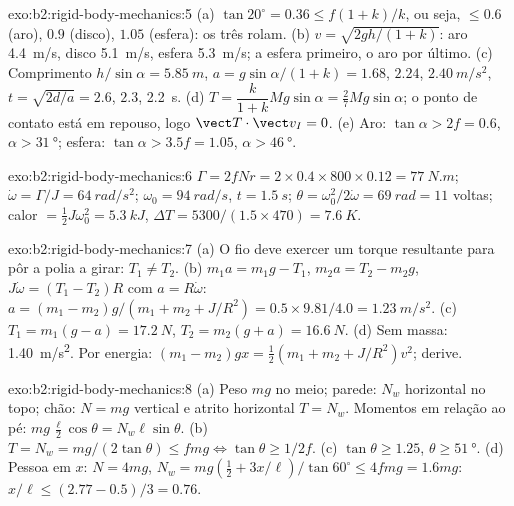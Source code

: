 \begin{solution}{exo:b2:rigid-body-mechanics:5}
(a) $\tan20^\circ = 0.36 \le f(1 + k)/k$, ou seja, $\le 0.6$ (aro), $0.9$
(disco), $1.05$ (esfera): os três rolam. (b) $v = \sqrt{2gh/(1 + k)}$: aro
\qty{4.4}{m/s}, disco \qty{5.1}{m/s}, esfera \qty{5.3}{m/s}; a esfera primeiro, o aro
por último. (c) Comprimento $h/\sin\alpha = \qty{5.85}{m}$, $a = g\sin\alpha/(1 + k) =
1.68$, $2.24$, $\qty{2.40}{m/s^2}$, $t = \sqrt{2d/a} = 2.6$, $2.3$, \qty{2.2}{s}.
(d) $T = \dfrac{k}{1 + k}Mg\sin\alpha = \tfrac27Mg\sin\alpha$; o ponto de
contato está em repouso, logo $\vect T\cdot\vect v_I = 0$. (e) Aro: $\tan\alpha >
2f = 0.6$, $\alpha > \qty{31}{\degree}$; esfera: $\tan\alpha > 3.5f = 1.05$,
$\alpha > \qty{46}{\degree}$.
\end{solution}

\begin{solution}{exo:b2:rigid-body-mechanics:6}
$\Gamma = 2fNr = 2 \times 0.4 \times 800 \times 0.12 = \qty{77}{N.m}$; $\dot\omega =
\Gamma/J = \qty{64}{rad/s^2}$; $\omega_0 = \qty{94}{rad/s}$, $t = \qty{1.5}{s}$;
$\theta = \omega_0^2/2\dot\omega = \qty{69}{rad} = 11$ voltas; calor $= \tfrac12J
\omega_0^2 = \qty{5.3}{kJ}$, $\Delta T = 5300/(1.5 \times 470) = \qty{7.6}{K}$.
\end{solution}

\begin{solution}{exo:b2:rigid-body-mechanics:7}
(a) O fio deve exercer um torque resultante para pôr a polia a girar: $T_1 \ne T_2$.
(b) $m_1a = m_1g - T_1$, $m_2a = T_2 - m_2g$, $J\dot\omega = (T_1 - T_2)R$ com
$a = R\dot\omega$: $a = (m_1 - m_2)g/(m_1 + m_2 + J/R^2) = 0.5 \times 9.81/4.0 =
\qty{1.23}{m/s^2}$. (c) $T_1 = m_1(g - a) = \qty{17.2}{N}$, $T_2 = m_2(g + a) =
\qty{16.6}{N}$. (d) Sem massa: \qty{1.40}{m/s^2}. Por energia: $(m_1 - m_2)gx =
\tfrac12(m_1 + m_2 + J/R^2)v^2$; derive.
\end{solution}

\begin{solution}{exo:b2:rigid-body-mechanics:8}
(a) Peso $mg$ no meio; parede: $N_w$ horizontal no topo; chão:
$N = mg$ vertical e atrito horizontal $T = N_w$. Momentos em relação ao
pé: $mg\,\tfrac{\ell}2\cos\theta = N_w\ell\sin\theta$. (b) $T = N_w =
mg/(2\tan\theta) \le fmg \iff \tan\theta \ge 1/2f$. (c) $\tan\theta \ge
1.25$, $\theta \ge \qty{51}{\degree}$. (d) Pessoa em $x$: $N = 4mg$, $N_w =
mg(\tfrac12 + 3x/\ell)/\tan60^\circ \le 4fmg = 1.6mg$: $x/\ell \le (2.77 -
0.5)/3 = 0.76$.
\end{solution}

